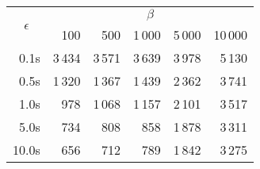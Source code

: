 \begin{tabular}{rrrrrr}
\toprule
\multicolumn{1}{c}{\multirow[c]{2}{*}{$\epsilon$}} & \multicolumn{5}{c}{$\beta$} \\ \cmidrule(lr){2-6}
{} &  100   &  500   &  1\,000  &  5\,000  &  10\,000 \\
\midrule
0.1s  &   3\,434 &   3\,571 &   3\,639 &   3\,978 &   5\,130 \\
0.5s  &   1\,320 &   1\,367 &   1\,439 &   2\,362 &   3\,741 \\
1.0s  &    978 &   1\,068 &   1\,157 &   2\,101 &   3\,517 \\
5.0s  &    734 &    808 &    858 &   1\,878 &   3\,311 \\
10.0s &    656 &    712 &    789 &   1\,842 &   3\,275 \\
\bottomrule
\end{tabular}


